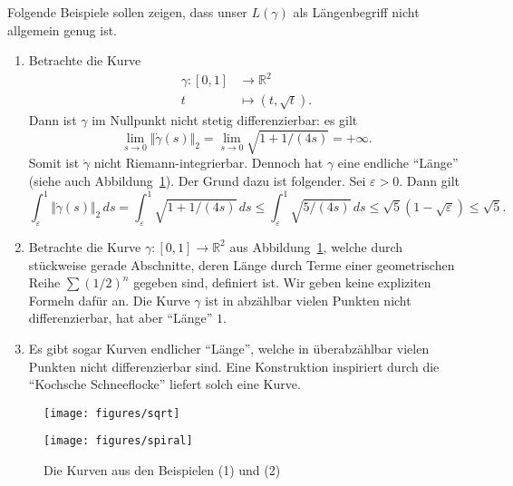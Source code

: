 \documentclass[../main.tex]{subfiles}
\begin{document}
\begin{examples}
  Folgende Beispiele sollen zeigen, dass
  unser $L(\gamma)$ als Längenbegriff nicht
  allgemein genug ist.
  \begin{enumerate}[(1)]
    \item Betrachte die Kurve
      \begin{align*}
        \gamma \colon [0, 1] & \to \mathbb{R}^2 \\
        t & \mapsto (t, \sqrt{t}).
      \end{align*}
      Dann ist $\gamma$ 
      im Nullpunkt nicht stetig
      differenzierbar: es gilt
      \[
        \lim_{s \to 0}
        \Vert \dot \gamma(s) \Vert_2
        = \lim_{s \to 0}
        \sqrt{1 + 1/(4s)} = +\infty.
      \]
      Somit ist $\dot \gamma$ 
      nicht Riemann-integrierbar.
      Dennoch hat $\gamma$ eine
      endliche ``Länge'' (siehe auch
      Abbildung~\ref{fig:rectifiability}).
      Der Grund dazu ist folgender.
      Sei $\varepsilon > 0$.
      Dann gilt
      \[
        \int_{\varepsilon}^{1} 
        \Vert \dot \gamma(s) \Vert_2\, ds
        =
        \int_{\varepsilon}^{1} 
        \sqrt{1 + 1/(4s)} \, ds
        \leq \int_{\varepsilon}^{1} 
        \sqrt{5/(4s)} \, ds
        \leq \sqrt 5 (1 - \sqrt{\varepsilon})
        \leq \sqrt 5.
      \]
    \item Betrachte die Kurve $\gamma \colon [0, 1] \to \mathbb{R}^2$ 
      aus Abbildung~\ref{fig:rectifiability},
      welche durch stückweise gerade Abschnitte,
      deren Länge durch Terme einer geometrischen
      Reihe $\sum {(1/2)}^n$ gegeben sind, definiert ist.
      Wir geben keine expliziten Formeln dafür an.
      Die Kurve $\gamma$ ist in abzählbar vielen
      Punkten nicht differenzierbar,
      hat aber ``Länge'' $1$.
    \item Es gibt sogar Kurven endlicher ``Länge'',
      welche in überabzählbar vielen Punkten nicht
      differenzierbar sind.
      Eine Konstruktion inspiriert durch
      die ``Kochsche Schneeflocke'' liefert
      solch eine Kurve.
  \end{enumerate}
\end{examples}

\begin{figure}[htb] 
  \centering
  \begin{minipage}{0.50\textwidth}
    \centering
    \texttt{[image: figures/sqrt]}
  \end{minipage}%
  \begin{minipage}{0.50\textwidth}
    \centering
    \texttt{[image: figures/spiral]}
  \end{minipage}%
  \caption{Die Kurven aus den Beispielen (1) und (2)}%
  \label{fig:rectifiability}
\end{figure}
\end{document}
